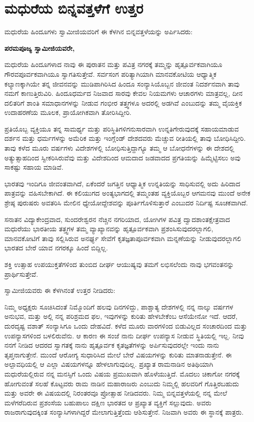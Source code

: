 
\chapter{ಮಧುರೆಯ ಬಿನ್ನವತ್ತಳೆಗೆ ಉತ್ತರ}

ಮಧುರೆಯ ಹಿಂದೂಗಳು ಸ್ವಾಮೀಜಿಯವರಿಗೆ ಈ ಕೆಳಗಿನ ಬಿನ್ನವತ್ತಳೆಯನ್ನು ಅರ್ಪಿಸಿದರು:

\textbf{ಪರಮಪೂಜ್ಯ ಸ್ವಾಮೀಜಿಯವರೇ,}

ಮಧುರೆಯ ಹಿಂದೂಗಳಾದ ನಾವು ಈ ಪುರಾತನ ಮತ್ತು ಪವಿತ್ರ ನಗರಕ್ಕೆ ತಮ್ಮನ್ನು ಹೃತ್ಪೂರ್ವಕವಾಗಿಯೂ ಗೌರವಪೂರ್ವಕವಾಗಿಯೂ ಸ್ವಾಗತಿಸುತ್ತೇವೆ. ಸರ್ವಸಂಗ ಪರಿತ್ಯಾಗಿಯಾಗಿ ಮಾನವಕೋಟಿಯ ಆಧ್ಯಾತ್ಮಿಕ ಕಲ್ಯಾಣಕ್ಕಾಗಿಯೇ ತನ್ನ ಜೀವನವನ್ನು ಮುಡಿಪಾಗಿರಿಸಿದ ಹಿಂದೂ ಸಂನ್ಯಾಸಿಯೊಬ್ಬನ ಜೀವಂತ ನಿದರ್ಶನವಾಗಿ ತಾವು ನಮಗೆ ಕಾಣುತ್ತಿರುವಿರಿ. ಹಿಂದೂಧರ್ಮದ ನಿಜವಾದ ಸಾರವು ಕೇವಲ ನಿಯಮಗಳು ಆಚಾರಗಳು ಮಾತ್ರವಲ್ಲ, ದೀನ ದಲಿತರಿಗೆ ಶಾಂತಿ ಸಮಾಧಾನಗಳನ್ನು ನೀಡುವ ಗಂಭೀರ ತತ್ತ್ವಗಳೂ ಅದರಲ್ಲಿ ಅಡಗಿವೆ ಎಂಬುದನ್ನು ತಮ್ಮ ವೈಯಕ್ತಿಕ ಉದಾಹರಣೆಯ ಮೂಲಕ, ಪ್ರಾಯೋಗಿಕವಾಗಿ ತೋರಿಸಿದ್ದೀರಿ.

ಪ್ರತಿಯೊಬ್ಬ ವ್ಯಕ್ತಿಯೂ ತನ್ನ ಸಾಮರ್ಥ್ಯ ಮತ್ತು ಪರಿಸ್ಥಿತಿಗಳಿಗನುಸಾರವಾಗಿ ಉನ್ನತಿಗೇರುವುದಕ್ಕೆ ಸಹಾಯಮಾಡುವ ದರ್ಶನ ಮತ್ತು ಧರ್ಮಗಳನ್ನು ಅಮೆರಿಕ ಮತ್ತು ಇಂಗ್ಲೆಂಡ್​ ದೇಶದವರು ಮೆಚ್ಚುವ ರೀತಿಯಲ್ಲಿ ತಾವು ಬೋಧಿಸಿದ್ದೀರಿ. ತಾವು ಕಳೆದ ಮೂರು ವರ್ಷಗಳು ವಿದೇಶಗಳಲ್ಲಿ ಬೋಧಿಸುತ್ತಿದ್ದಾಗ್ಯೂ ತಮ್ಮ ಆ ಬೋಧನೆಗಳನ್ನು ಈ ದೇಶದಲ್ಲಿ ಅತ್ಯುತ್ಸಾಹದಿಂದ ಸ್ವೀಕರಿಸಿರುವೆವು ಮತ್ತು ವಿದೇಶದಿಂದ ಆಮದಾದ ಜಡವಾದದ ಪ್ರಗತಿಯನ್ನು ಹಿಮ್ಮೆಟ್ಟಿಸಲು ಅವು ಸಾಕಷ್ಟು ಸಹಾಯ ಮಾಡಿವೆ.

ಭಾರತವು ಇಂದಿಗೂ ಜೀವಂತವಾಗಿದೆ, ಏಕೆಂದರೆ ಜಗತ್ತಿನ ಆಧ್ಯಾತ್ಮಿಕ ಉನ್ನತಿಯನ್ನು ಸಾಧಿಸುವಲ್ಲಿ ಅದು ಹಿರಿದಾದ ಪಾತ್ರವನ್ನು ವಹಿಸಬೇಕಾಗಿದೆ. ಈ ಕಲಿಯುಗದ ಅಂತ್ಯಭಾಗದಲ್ಲಿ ತಮ್ಮಂತಹ ವ್ಯಕ್ತಿಯೊಬ್ಬರ ಆಗಮನವು ಮುಂದೆ ಅನೇಕ ಶ್ರೇಷ್ಠ ಪುರುಷರು ಅವತರಿಸಿ ಮೇಲಿನ ಧ್ಯೇಯೋದ್ದೇಶವನ್ನು ಪೂರ್ತಿಗೊಳಿಸುತ್ತಾರೆ ಎಂಬುದರ ನಿರ್ದಿಷ್ಟ ಸೂಚಕವಾಗಿದೆ.

ಸನಾತನ ವಿದ್ಯಾಕೇಂದ್ರವಾದ, ಸುಂದರೇಶ್ವರನ ನೆಚ್ಚಿನ ನಗರಿಯಾದ, ಯೋಗಿಗಳ ಪವಿತ್ರ ದ್ವಾದಶಾಂತಕ್ಷೇತ್ರವಾದ ಮಧುರೆಯು ಭಾರತೀಯ ತತ್ತ್ವಗಳ ತಮ್ಮ ವ್ಯಾಖ್ಯಾನವನ್ನು ಹೃತ್ಪೂರ್ವಕವಾಗಿ ಪ್ರಶಂಸಿಸುವುದರಲ್ಲಾಗಲಿ, ಮಾನವಕೋಟಿಗೆ ತಾವು ಸಲ್ಲಿಸಿರುವ ಅನರ್ಘ್ಯ ಸೇವೆಗೆ ಕೃತಜ್ಞತಾಪೂರ್ವಕವಾಗಿ ಮನ್ನಣೆಯನ್ನು ನೀಡುವುದರಲ್ಲಾಗಲಿ ಭಾರತದ ಬೇರೆ ಯಾವ ನಗರಕ್ಕೂ ಹಿಂದೆ ಬಿದ್ದಿಲ್ಲ.

ಶಕ್ತಿ ಉತ್ಸಾಹ ಉಪಯುಕ್ತತೆಗಳಿಂದ ತುಂಬಿದ ದೀರ್ಘ ಆಯುಷ್ಯವು ತಮಗೆ ಲಭಿಸಲೆಂದು ನಾವು ಭಗವಂತನನ್ನು ಪ್ರಾರ್ಥಿಸುತ್ತೇವೆ.

ಸ್ವಾಮೀಜಿಯವರು ಈ ಕೆಳಗಿನಂತೆ ಉತ್ತರ ನೀಡಿದರು:

ನಿಮ್ಮ ಅಧ್ಯಕ್ಷರು ಸೂಚಿಸಿದಂತೆ ನಿಮ್ಮೊಂದಿಗೆ ಹಲವು ದಿನಗಳಿದ್ದು, ಪಾಶ್ಚಾತ್ಯ ದೇಶಗಳಲ್ಲಿ ನನ್ನ ನಾಲ್ಕು ವರ್ಷಗಳ ಅನುಭವ, ಮತ್ತು ಅಲ್ಲಿ ನನ್ನ ಪರಿಶ್ರಮದ ಫಲ, ಇವುಗಳನ್ನು ಕುರಿತು ಹೇಳಬೇಕೆಂಬ ಆಸೆಯೇನೋ ಇದೆ. ಆದರೆ, ದುರದೃಷ್ಟ ವಶಾತ್​ ಸಂನ್ಯಾಸಿಗೂ ಒಂದು ದೇಹವಿದೆ. ಕಳೆದ ಮೂರು ವಾರಗಳಿಂದ ಬಿಡುವಿಲ್ಲದ ಸಂಚಾರದಿಂದ ಮತ್ತು ಉಪನ್ಯಾಸಗಳಿಂದ ಬಳಲಿರುವೆನು. ಆ ಕಾರಣ ಈ ಸಂಜೆ ನಾನು ದೀರ್ಘ ಉಪನ್ಯಾಸ ನೀಡುವ ಸ್ಥಿತಿಯಲ್ಲಿ ಇಲ್ಲ. ನೀವು ನನಗೆ ನೀಡಿದ ಆದರದ ಸ್ವಾಗತಕ್ಕೆ ನಾನು ಹೃತ್ಪೂರ್ವಕ ಕೃತಜ್ಞತೆಗಳನ್ನು ಅರ್ಪಿಸುವುದರಲ್ಲೇ ಇಂದು ನಾನು ತೃಪ್ತನಾಗುತ್ತೇನೆ. ಮುಂದೆ ಆರೋಗ್ಯ ಸುಧಾರಿಸಿದ ಮೇಲೆ ಬೇರೆ ವಿಷಯಗಳನ್ನು ಕುರಿತು ಮಾತನಾಡುತ್ತೇನೆ. ಈ ಅಲ್ಪಾವಧಿಯಲ್ಲಿ ಆ ಎಲ್ಲಾ ವಿಷಯಗಳನ್ನೂ ಹೇಳಲಾಗುವುದಿಲ್ಲ. ಪ್ರಖ್ಯಾತ ರಾಮನಾಡಿನ ಅತಿಥಿಯಾಗಿ ಮಧುರೆಯಲ್ಲಿರುವ ನನ್ನ ಮನಸ್ಸಿಗೆ ಒಂದು ವಿಷಯ ಪ್ರಮುಖವಾಗಿ ಹೊಳೆಯುತ್ತಿದೆ. ಮೊದಲು ಚಿಕಾಗೋ ನಗರಕ್ಕೆ ಹೋಗುವಂತೆ ಸಲಹೆ ಕೊಟ್ಟವರು ರಾಮ ನಾಡಿನ ಮಹಾರಾಜರು ಎಂಬುದು ನಿಮ್ಮಲ್ಲಿ ಹಲವರಿಗೆ ಗೊತ್ತಿರಬಹುದು ಮತ್ತು ಅವರೇ ಈ ವಿಷಯದಲ್ಲಿ ನಿರಂತರವೂ ಪ್ರೋತ್ಸಾಹ ನೀಡಿದವರು. ನಿಮ್ಮ ಬಿನ್ನವತ್ತಳೆಯಲ್ಲಿ ನನ್ನ ಮೇಲೆ ಮಳೆಗರೆದಿರುವ ಪ್ರಶಂಸೆಯ ಬಹುಪಾಲು ದಕ್ಷಿಣ ಭಾರತದ ಆ ಪ್ರಖ್ಯಾತ ವ್ಯಕ್ತಿಗೆ ಸಲ್ಲುವುದು. ಅವರು ರಾಜರಾಗುವುದಕ್ಕಿಂತ ಸಂನ್ಯಾಸಿಗಳಾಗಿದ್ದರೆ ಮೇಲಾಗುತ್ತಿತ್ತೆಂದು ಆಶಿಸುತ್ತೇನೆ. ನಿಜವಾಗಿ ಅವರು ಈ ಸ್ಥಾನಕ್ಕೆ ಪಾತ್ರರು.

